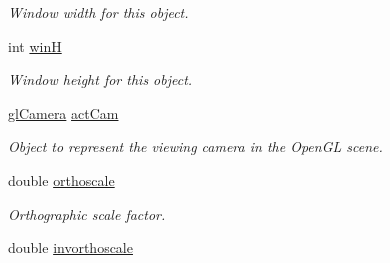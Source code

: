 \begin{DoxyCompactItemize}
\begin{DoxyCompactList}\small\item\em Window width for this object. \end{DoxyCompactList}\item 
\hypertarget{class_mosaic_base_ab920c0e00ebeec542d5ac9b51bb98fbd}{
int \hyperlink{class_mosaic_base_ab920c0e00ebeec542d5ac9b51bb98fbd}{winH}}
\label{class_mosaic_base_ab920c0e00ebeec542d5ac9b51bb98fbd}

\begin{DoxyCompactList}\small\item\em Window height for this object. \end{DoxyCompactList}\item 
\hypertarget{class_mosaic_base_abf94ba18f2233ffbe7ff7f6f8bec7df1}{
\hyperlink{classgl_camera}{glCamera} \hyperlink{class_mosaic_base_abf94ba18f2233ffbe7ff7f6f8bec7df1}{actCam}}
\label{class_mosaic_base_abf94ba18f2233ffbe7ff7f6f8bec7df1}

\begin{DoxyCompactList}\small\item\em Object to represent the viewing camera in the OpenGL scene. \end{DoxyCompactList}\item 
\hypertarget{class_mosaic_base_a70e549971719968b8396fe0c964c7dc9}{
double \hyperlink{class_mosaic_base_a70e549971719968b8396fe0c964c7dc9}{orthoscale}}
\label{class_mosaic_base_a70e549971719968b8396fe0c964c7dc9}

\begin{DoxyCompactList}\small\item\em Orthographic scale factor. \end{DoxyCompactList}\item 
\hypertarget{class_mosaic_base_afebd7f30ebfadaa62ce049e4f6ca33cc}{
double \hyperlink{class_mosaic_base_afebd7f30ebfadaa62ce049e4f6ca33cc}{invorthoscale}}
\label{class_mosaic_base_afebd7f30ebfadaa62ce049e4f6ca33cc}


\end{DoxyCompactItemize}
